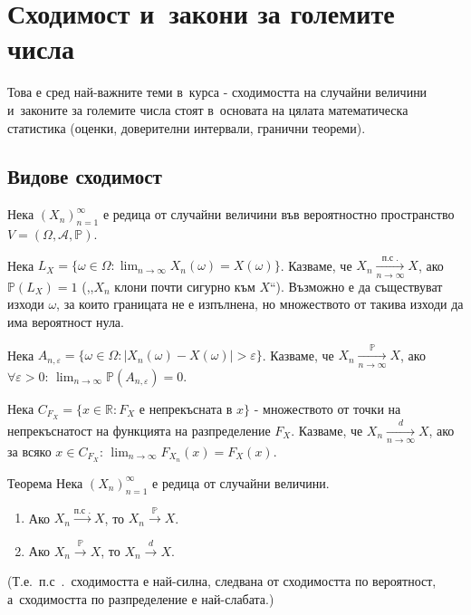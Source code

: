 \chapter{Сходимост и~закони за големите числа}

\begin{rembox}[Забележка]
Това е сред най-важните теми в~курса - сходимостта на случайни
величини и~законите за големите числа стоят в~основата на цялата
математическа статистика (оценки, доверителни интервали, гранични
теореми).
\end{rembox}

\section{Видове сходимост}

\begin{rembox}[Постановка]
Нека $(X_n)_{n=1}^{\infty}$ е редица от случайни величини във
вероятностно пространство $V=(\Omega,\mathcal A,\mathbb P)$.
\end{rembox}

\begin{defbox}
Нека $L_X = \{\omega\in\Omega : \lim_{n\to\infty}X_n(\omega)=X(\omega)\}$.
Казваме, че $X_n\xrightarrow[n\to\infty]{\text{п.с~.}} X$, ако
$\mathbb P(L_X)=1$ (,,$X_n$ клони почти сигурно към $X$``). Възможно
е да съществуват изходи $\omega$, за които границата не е изпълнена,
но множеството от такива изходи да има вероятност нула.
\end{defbox}

\begin{defbox}
Нека $A_{n,\varepsilon} = \{\omega\in\Omega : |X_n(\omega)-X(\omega)|
>\varepsilon\}$. Казваме, че $X_n\xrightarrow[n\to\infty]{\mathbb P}
X$, ако $\forall\varepsilon>0$: $\lim_{n\to\infty}\mathbb
P(A_{n,\varepsilon})=0$.
\end{defbox}

\begin{defbox}
Нека $C_{F_X}=\{x\in\mathbb R : F_X\text{ е непрекъсната в~} x\}$ -
множеството от точки на непрекъснатост на функцията на разпределение
$F_X$. Казваме, че $X_n\xrightarrow[n\to\infty]{d} X$, ако за всяко
$x\in C_{F_X}$: $\lim_{n\to\infty}F_{X_n}(x)=F_X(x)$.
\end{defbox}

\begin{thmbox}[]{Теорема}
Нека $(X_n)_{n=1}^{\infty}$ е редица от случайни величини.
\begin{enumerate}[label=\alph*)]
  \item Ако $X_n\xrightarrow{\text{п.с~.}}X$, то $X_n\xrightarrow{\mathbb P}X$.
  \item Ако $X_n\xrightarrow{\mathbb P}X$, то $X_n\xrightarrow{d}X$.
\end{enumerate}
(Т.е.\ п.с~.\ сходимостта е най-силна, следвана от сходимостта по
вероятност, а~сходимостта по разпределение е най-слабата.)
\end{thmbox}

